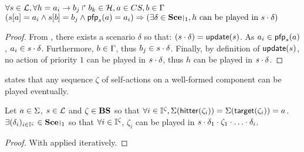 \begin{theorem}
\label{th:hcscomp}
  $\forall s \in \mathcal{L}, \forall h = a_i\rightarrow b_j\Rsh b_k \in \mathcal{H}, a \in CS, b \in \Gamma$\\
  $(\PHget{s}{a} = a_i \wedge \PHget{s}{b} = b_j \wedge \pfp_s(a) = a_i) \Rightarrow (\exists \delta \in \restriction{\Sce}{1}, \text{$h$ can be played in $s \PHplay \delta$})$
\end{theorem}
\begin{proof}
  From , there exists a scenario $\delta$ so that: $(s \cdot \delta) = \mathsf{update}(s)$.
  As $a_i \in \mathsf{pfp}_s(a)$, $a_i \in s \cdot \delta$.
  Furthermore, $b \in \Gamma$, thus $b_j \in s \cdot \delta$.
  Finally, by definition of $\mathsf{update}(s)$, no action of priority $1$ can be played in $s \cdot \delta$, thus $h$ can be played in $s \cdot \delta$.
\end{proof}

 states that any sequence $\zeta$ of self-actions on a well-formed component can be played eventually.
\begin{theorem}
\label{th:autohits}
  Let $a \in \Sigma$, $s \in \mathcal{L}$ and $\zeta \in \mathbf{BS}$ so that $\forall i \in \mathbb{I}^{\zeta}, \Sigma(\mathsf{hitter}(\zeta_i)) = \Sigma(\mathsf{target}(\zeta_i)) = a$.
  $\exists (\delta_i)_{i \in \indexes{\zeta}} \in \restriction{\Sce}{1}$ so that $\forall i \in \mathbb{I}^{\zeta}$, $\zeta_i$ can be played in $s \PHplay \delta_1 \PHplay \zeta_1 \PHplay \dots \PHplay \delta_i$. 
\end{theorem}
\begin{proof}
  With  applied iteratively.
\end{proof}

